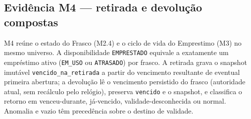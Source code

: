\subsection*{Evidência M4 --- retirada e devolução compostas}
M4 reúne o estado do Frasco (M2.4) e o ciclo de vida do Emprestimo (M3) no mesmo universo. A disponibilidade \texttt{EMPRESTADO} equivale a exatamente um empréstimo ativo (\texttt{EM\_USO} ou \texttt{ATRASADO}) por frasco. A retirada grava o snapshot imutável \texttt{vencido\_na\_retirada} a partir do vencimento resultante de eventual primeira abertura; a devolução lê o vencimento persistido do frasco (autoridade atual, sem recálculo pelo relógio), preserva \texttt{vencido} e o snapshot, e classifica o retorno em venceu-durante, já-vencido, validade-desconhecida ou normal. Anomalia e vazio têm precedência sobre o destino de validade.
